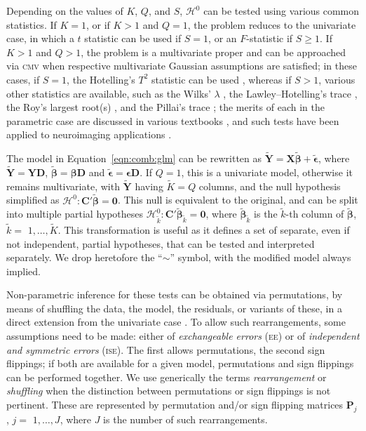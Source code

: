 Depending on the values of $K$, $Q$, and $S$, $\mathcal{H}^0$ can be tested using various common statistics. If $K=1$, or if $K>1$ and $Q=1$, the problem reduces to the univariate case, in which a $t$ statistic can be used if $S=1$, or an $F$-statistic if $S \geqslant 1$. If $K>1$ and $Q>1$, the problem is a multivariate proper and can be approached via \textsc{cmv} when respective multivariate Gaussian assumptions are satisfied; in these cases, if $S = 1$, the Hotelling's $T^2$ statistic can be used \citep{Hotelling1931}, whereas if $S>1$, various other statistics are available, such as the Wilks' $\lambda$ \citep{Wilks1932}, the Lawley--Hotelling's trace \citep{Lawley1938, Hotelling1951}, the Roy's largest root(s) \citep{Roy1953, Kuhfeld1986}, and the Pillai's trace \citep{Pillai1955}; the merits of each in the parametric case are discussed in various textbooks \citep[e.g.,][]{Christensen2001, Timm2002, Anderson2003, Johnson2007}, and such tests have been applied to neuroimaging applications \citep{Chen2014}.

The model in Equation~\ref{eqn:comb:glm} can be rewritten as $\tilde{\mathbf{Y}} = \mathbf{X}\tilde{\boldsymbol{\beta}} + \tilde{\boldsymbol{\epsilon}}$, where $\tilde{\mathbf{Y}}=\mathbf{Y}\mathbf{D}$, $\tilde{\boldsymbol{\beta}}=\boldsymbol{\beta}\mathbf{D}$ and $\tilde{\boldsymbol{\epsilon}}=\boldsymbol{\epsilon}\mathbf{D}$. If $Q=1$, this is a univariate model, otherwise it remains multivariate, with $\tilde{\mathbf{Y}}$ having $\tilde{K}=Q$ columns, and the null hypothesis simplified as $\mathcal{H}^{0} : \mathbf{C}'\tilde{\boldsymbol{\beta}} = \boldsymbol{0}$. This null is equivalent to the original, and can be split into multiple partial hypotheses $\mathcal{H}^{0}_{\tilde{k}} : \mathbf{C}'\tilde{\boldsymbol{\beta}}_{\tilde{k}} = \boldsymbol{0}$, where $\tilde{\boldsymbol{\beta}}_{\tilde{k}}$ is the $\tilde{k}$-th column of $\tilde{\boldsymbol{\beta}}$, $\tilde{k} =$ $1, \ldots , \tilde{K}$. This transformation is useful as it defines a set of separate, even if not independent, partial hypotheses, that can be tested and interpreted separately. We drop heretofore the ``$\sim$'' symbol, with the modified model always implied.

Non-parametric inference for these tests can be obtained via permutations, by means of shuffling the data, the model, the residuals, or variants of these, in a direct extension from the univariate case \citep[Table~\ref{tab:perm:methods}, also published in]{Winkler2014}. To allow such rearrangements, some assumptions need to be made: either of \emph{exchangeable errors} (\textsc{ee}) or of \emph{independent and symmetric errors} (\textsc{ise}). The first allows permutations, the second sign flippings; if both are available for a given model, permutations and sign flippings can be performed together. We use generically the terms \emph{rearrangement} or \emph{shuffling} when the distinction between permutations or sign flippings is not pertinent. These are represented by permutation and/or sign flipping matrices $\mathbf{P}_{j}$, $j =$ $1, \ldots , J$, where $J$ is the number of such rearrangements.

